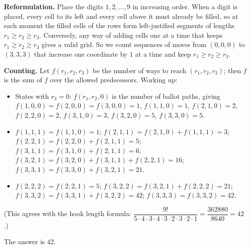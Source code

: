 \textbf{Reformulation.} Place the digits $1,2,\ldots,9$ in increasing order. When a digit is placed, every cell to its left and every cell above it must already be filled, so at each moment the filled cells of the rows form left-justified segments of lengths $r_1\ge r_2\ge r_3$. Conversely, any way of adding cells one at a time that keeps $r_1\ge r_2\ge r_3$ gives a valid grid. So we count sequences of moves from $(0,0,0)$ to $(3,3,3)$ that increase one coordinate by $1$ at a time and keep $r_1\ge r_2\ge r_3$.

\textbf{Counting.} Let $f(r_1,r_2,r_3)$ be the number of ways to reach $(r_1,r_2,r_3)$; then $f$ is the sum of $f$ over the allowed predecessors. Working up:
\begin{itemize}
\item States with $r_3=0$: $f(r_1,r_2,0)$ is the number of ballot paths, giving $f(1,0,0)=f(2,0,0)=f(3,0,0)=1$, $f(1,1,0)=1$, $f(2,1,0)=2$, $f(2,2,0)=2$, $f(3,1,0)=3$, $f(3,2,0)=5$, $f(3,3,0)=5$.
\item $f(1,1,1)=f(1,1,0)=1$; $f(2,1,1)=f(2,1,0)+f(1,1,1)=3$; $f(2,2,1)=f(2,2,0)+f(2,1,1)=5$; $f(3,1,1)=f(3,1,0)+f(2,1,1)=6$; $f(3,2,1)=f(3,2,0)+f(3,1,1)+f(2,2,1)=16$; $f(3,3,1)=f(3,3,0)+f(3,2,1)=21$.
\item $f(2,2,2)=f(2,2,1)=5$; $f(3,2,2)=f(3,2,1)+f(2,2,2)=21$; $f(3,3,2)=f(3,3,1)+f(3,2,2)=42$; $f(3,3,3)=f(3,3,2)=42$.
\end{itemize}
(This agrees with the hook length formula: $\dfrac{9!}{5\cdot4\cdot3\cdot4\cdot3\cdot2\cdot3\cdot2\cdot1}=\dfrac{362880}{8640}=42$.)

The answer is $\boxed{42}$.
